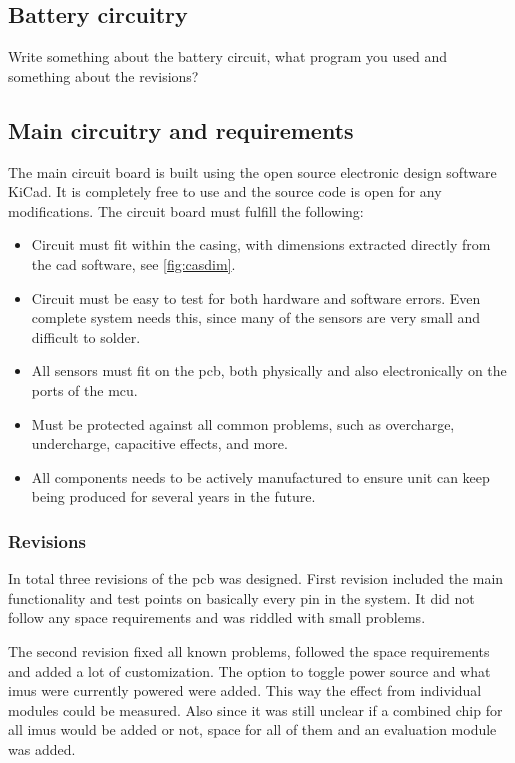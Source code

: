 \subsection{Battery circuitry}
Write something about the battery circuit, what program you used and something about the revisions?

\subsection{Main circuitry and requirements}
The main circuit board is built using the open source electronic design software KiCad\cite{kicad}. It is completely free to use and the source code is open for any modifications.
The circuit board must fulfill the following:
\begin{itemize}
\item Circuit must fit within the casing, with dimensions extracted directly from the cad software\cite{cad}, see \autoref{fig:casdim}.
\item Circuit must be easy to test for both hardware and software errors. Even complete system needs this, since many of the sensors are very small and difficult to solder.
\item All sensors must fit on the \gls{pcb}, both physically and also electronically on the ports of the \gls{mcu}.
\item Must be protected against all common problems, such as overcharge, undercharge, capacitive effects, and more.
\item All components needs to be actively manufactured to ensure unit can keep being produced for several years in the future.
\end{itemize}

\subsubsection{Revisions}
In total three revisions of the \gls{pcb} was designed. First revision included the main functionality and test points on basically every pin in the system. It did not follow any space requirements and was riddled with small problems.

The second revision fixed all known problems, followed the space requirements and added a lot of customization. The option to toggle power source and what \gls{imu}s were currently powered were added. This way the effect from individual modules could be measured. Also since it was still unclear if a combined chip for all \gls{imu}s would be added or not, space for all of them and an evaluation module was added.

